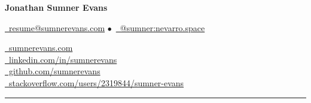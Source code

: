 \documentclass[10pt,letterpaper]{article}
\begin{document}
\begin{minipage}[b][][b]{0.5\linewidth}
    {\huge\textbf{Jonathan Sumner Evans}}

    \vspace{5pt}
    \href{mailto:resume@sumnerevans.com}{\faEnvelope\ resume@sumnerevans.com}
    $\bullet$\ \href{https://matrix.to/#/@sumner:nevarro.space}{\faMatrixOrg\ @sumner:nevarro.space}
\end{minipage}\hfill
\begin{minipage}[b][][b]{0.4375\linewidth}
    \href{https://sumnerevans.com}{\faGlobe\ sumnerevans.com} \\
    \href{https://www.linkedin.com/in/sumnerevans}{\faLinkedin\ linkedin.com/in/sumnerevans} \\
    \href{https://github.com/sumnerevans}{\faGithub\ github.com/sumnerevans} \\
    \href{https://stackoverflow.com/users/2319844/sumner-evans}{\faStackOverflow\ stackoverflow.com/users/2319844/sumner-evans}
\end{minipage}
\rule{\textwidth}{0.5pt}
\end{document}
